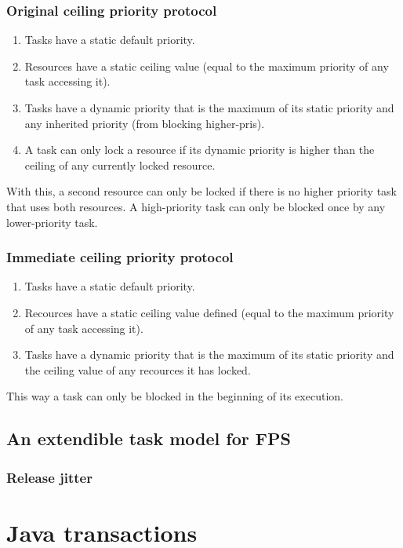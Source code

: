 \documentclass[a4paper, 12pt]{article}
\begin{document}
\subsubsection{Original ceiling priority protocol}
\begin{enumerate}
	\item Tasks have a static default priority.
	\item Resources have a static ceiling value (equal to the maximum priority of any task accessing it).
	\item Tasks have a dynamic priority that is the maximum of its static priority and any inherited priority (from blocking higher-pris).
	\item A task can only lock a resource if its dynamic priority is higher than the ceiling of any currently locked resource.
\end{enumerate}
With this, a second resource can only be locked if there is no higher priority task that uses both resources. A high-priority task can only be blocked once by any lower-priority task.

\subsubsection{Immediate ceiling priority protocol}
\begin{enumerate}
	\item Tasks have a static default priority.
	\item Recources have a static ceiling value defined (equal to the maximum priority of any task accessing it).
	\item Tasks have a dynamic priority that is the maximum of its static priority and the ceiling value of any recources it has locked.
\end{enumerate}
This way a task can only be blocked in the beginning of its execution.

\subsection{An extendible task model for FPS}
\subsubsection{Release jitter}


\section{Java transactions}
\end{document}
